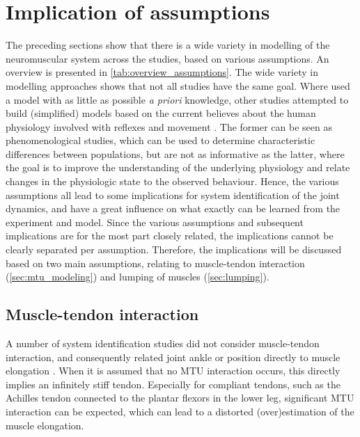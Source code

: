 \section{Implication of assumptions}
The preceding sections show that there is a wide variety in modelling of the neuromuscular system across the studies, based on various assumptions. An overview is presented in \autoref{tab:overview_assumptions}. The wide variety in modelling approaches shows that not all studies have the same goal. Where \cite{kearney_identification_1997, mirbagheri_intrinsic_2000, de_gooijer-van_de_groep_estimation_2016, jalaleddini_subspace_2017} used a model with as little as possible \textit{a priori} knowledge, other studies attempted to build (simplified) models based on the current believes about the human physiology involved with reflexes and movement \cite{zhang_simultaneous_1997, van_der_helm_identification_2002, schouten_nmclab_2008, mugge_rigorous_2010}. The former can be seen as phenomenological studies, which can be used to determine characteristic differences between populations, but are not as informative as the latter, where the goal is to improve the understanding of the underlying physiology and relate changes in the physiologic state to the observed behaviour. Hence, the various assumptions all lead to some implications for system identification of the joint dynamics, and have a great influence on what exactly can be learned from the experiment and model. Since the various assumptions and subsequent implications are for the most part closely related, the implications cannot be clearly separated per assumption. Therefore, the implications will be discussed based on two main assumptions, relating to muscle-tendon interaction (\autoref{sec:mtu_modeling}) and lumping of muscles (\autoref{sec:lumping}). 


\subsection{Muscle-tendon interaction}
A number of system identification studies did not consider muscle-tendon interaction, and consequently related joint ankle or position directly to muscle elongation \cite{zhang_simultaneous_1997, kearney_identification_1997, mirbagheri_intrinsic_2000, van_der_helm_identification_2002, de_gooijer-van_de_groep_estimation_2016}. When it is assumed that no MTU interaction occurs, this directly implies an infinitely stiff tendon. Especially for compliant tendons, such as the Achilles tendon connected to the plantar flexors in the lower leg, significant MTU interaction can be expected, which can lead to a distorted (over)estimation of the muscle elongation. %

